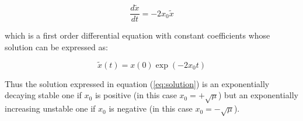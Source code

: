 \documentclass{article}
\begin{document}
	\begin{equation}
		\frac{d\tilde x}{dt} = -2x_0\tilde x
	\end{equation}
	
	which is a first order differential equation with constant coefficients whose solution can be expressed as:
	
	\begin{equation}
		\label{eq:solution}
		\tilde{x}(t) = x(0)\exp{(-2x_0t)} 
	\end{equation}
	
	Thus the solution expressed in equation (\ref{eq:solution}) is an exponentially decaying stable one if $x_0$ is positive (in this case $x_0 = +\sqrt{\mu}$) but an exponentially increasing unstable one if $x_0$ is negative (in this case $x_0 = -\sqrt{\mu}$).
\end{document}
